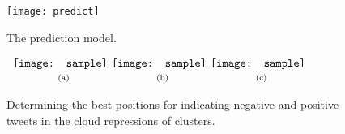 
\begin{figure}[t]
\begin{center}
\texttt{[image: predict]}
\end{center}
\vspace{-.1in}
\caption{The prediction model.}
\label{fig:predict-model}
\end{figure}

\begin{figure*}[t]
\begin{center}
$\begin{array}{c@{\hspace{0.01\linewidth}}c@{\hspace{0.01\linewidth}}c}
\texttt{[image: sample]} &
\texttt{[image: sample]} &
\texttt{[image: sample]}
\\
\mbox{\small{(a)}} & \mbox{\small{(b)}} & \mbox{\small{(c)}}
\end{array}$
\end{center}
\vspace{-.1in}
\caption{Determining the best positions for indicating negative and positive tweets in the cloud repressions of clusters.}
\label{fig:corners}
\end{figure*}

